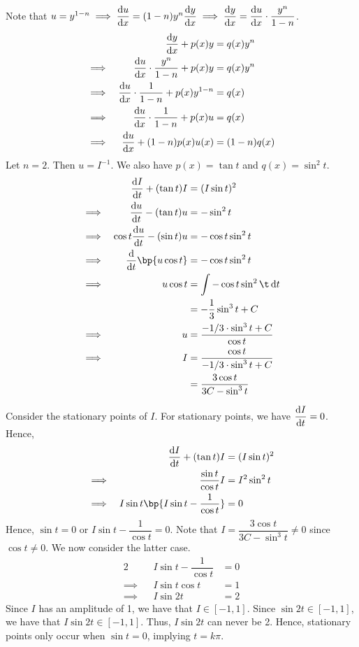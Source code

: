 \documentclass{echw}
\begin{document}
    \solution
        Note that $u = y^{1-n} \implies \dfrac{\mathrm{d} u}{\mathrm{d} x} = (1-n)y^n \dfrac{\mathrm{d} y}{\mathrm{d} x} \implies \dfrac{\mathrm{d} y}{\mathrm{d} x} = \dfrac{\mathrm{d} u}{\mathrm{d} x} \cdot \dfrac{y^n}{1-n}$.
        \begin{alignat*}{2}
            &&\dfrac{\mathrm{d} y}{\mathrm{d} x} + p(x) y &= q(x) y^n\\
            \implies&& \dfrac{\mathrm{d} u}{\mathrm{d} x} \cdot \dfrac{y^n}{1-n} + p(x)y &= q(x) y^n\\
            \implies&& \dfrac{\mathrm{d} u}{\mathrm{d} x} \cdot \dfrac{1}{1-n} + p(x)y^{1-n} &= q(x)\\
            \implies&& \dfrac{\mathrm{d} u}{\mathrm{d} x} \cdot \dfrac{1}{1-n} + p(x)u &= q(x)\\
            \implies&& \dfrac{\mathrm{d} u}{\mathrm{d} x} + (1-n)p(x)u(x) &= (1-n)q(x)
        \end{alignat*}
        Let $n = 2$. Then $u = I^{-1}$. We also have $p(x) = \tan t$ and $q(x) = \sin^2 t$.
        {\allowdisplaybreaks
        \begin{alignat*}{2}
            && \der{I}{t} + (\tan t) I &= (I \sin t)^2\\
            \implies&&\der{u}{t} - (\tan t)u &= -\sin^2 t\\
            \implies&&\cos t \der{u}{t} - (\sin t) u &= -\cos t \sin^2 t\\
            \implies&& \der{}{t} \bp{u \cos t} &= -\cos t \sin^2 t\\
            \implies&& u \cos t &= \int -\cos t \sin^2 \t \d t\\
            && &= -\dfrac13 \sin^3 t + C\\
            \implies&& u &= \dfrac{-1/3 \cdot \sin^3 t + C}{\cos t}\\
            \implies&& I &= \dfrac{\cos t}{-1/3 \cdot \sin^3 t + C}\\
            && &= \dfrac{3\cos t}{3C - \sin^3 t}
        \end{alignat*}}
        
        Consider the stationary points of $I$. For stationary points, we have $\dfrac{\mathrm{d} I}{\mathrm{d} t} = 0$. Hence,
        \begin{alignat*}{2}
            && \der{I}{t} + (\tan t) I &= (I \sin t)^2 \\
            \implies&& \dfrac{\sin t}{\cos t} I &= I^2 \sin^2 t\\
            \implies&& I \sin t \bp{I \sin t - \dfrac1{\cos t}} &= 0
        \end{alignat*}
        Hence, $\sin t = 0$ or $I \sin t - \dfrac1{\cos t} = 0$. Note that $I = \dfrac{3\cos t}{3C - \sin^3 t} \neq 0$ since $\cos t \neq 0$. We now consider the latter case.
        \begin{alignat*}{2}
            && I \sin t - \dfrac1{\cos t} &= 0\\
            \implies&& I \sin t \cos t &= 1\\
            \implies&& I \sin 2t &= 2
        \end{alignat*}
        Since $I$ has an amplitude of 1, we have that $I \in [-1, 1]$. Since $\sin 2t \in [-1, 1]$, we have that $I \sin 2t \in [-1, 1]$. Thus, $I \sin 2t$ can never be 2. Hence, stationary points only occur when $\sin t = 0$, implying $t = k\pi$.
        
\end{document}
